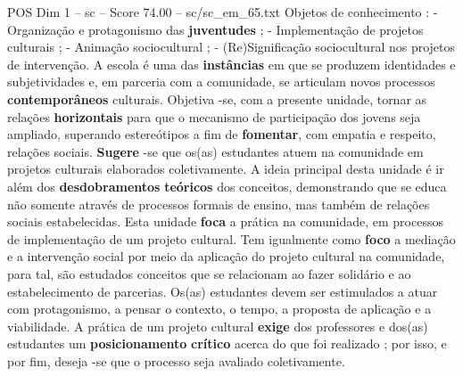 \begin{textsample}{POS Dim 1 – sc – Score 74.00 – sc/sc\_em\_65.txt}
Objetos de conhecimento : - Organização e protagonismo das \textbf{juventudes} ; - Implementação de projetos culturais ; - Animação sociocultural ; - (Re)Significação sociocultural nos projetos de intervenção.
A escola é uma das \textbf{instâncias} em que se produzem identidades e subjetividades e, em parceria com a comunidade, se articulam novos processos \textbf{contemporâneos} culturais.
Objetiva -se, com a presente unidade, tornar as relações \textbf{horizontais} para que o mecanismo de participação dos jovens seja ampliado, superando estereótipos a fim de \textbf{fomentar}, com empatia e respeito, relações sociais. \textbf{Sugere} -se que os(as) estudantes atuem na comunidade em projetos culturais elaborados coletivamente.
A ideia principal desta unidade é ir além dos \textbf{desdobramentos} \textbf{teóricos} dos conceitos, demonstrando que se educa não somente através de processos formais de ensino, mas também de relações sociais estabelecidas.
Esta unidade \textbf{foca} a prática na comunidade, em processos de implementação de um projeto cultural.
Tem igualmente como \textbf{foco} a mediação e a intervenção social por meio da aplicação do projeto cultural na comunidade, para tal, são estudados conceitos que se relacionam ao fazer solidário e ao estabelecimento de parcerias.
Os(as) estudantes devem ser estimulados a atuar com protagonismo, a pensar o contexto, o tempo, a proposta de aplicação e a viabilidade.
A prática de um projeto cultural \textbf{exige} dos professores e dos(as) estudantes um \textbf{posicionamento} \textbf{crítico} acerca do que foi realizado ; por isso, e por fim, deseja -se que o processo seja avaliado coletivamente.

\end{textsample}

